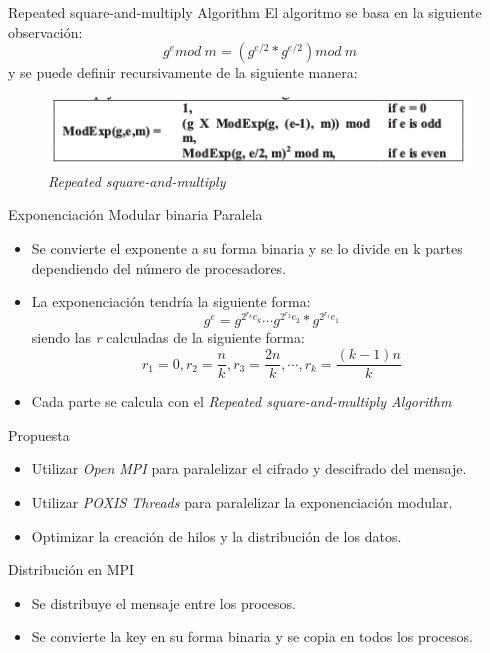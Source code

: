 \documentclass{beamer}
\begin{document}
\begin{frame}{Repeated square-and-multiply Algorithm}
  El algoritmo se basa en la siguiente observación:
  $$g^{e} mod\:m = (g^{e/2} * g^{e/2}) mod\:m$$
  y se puede definir recursivamente de la siguiente manera:
  \begin{figure}
   \centering
   \includegraphics[scale = 0.5]{1.png}
   \caption{\textit{Repeated square-and-multiply} \cite{Paper}}
   \label{fig:1}
  \end{figure}
\end{frame}

\begin{frame}{Exponenciación Modular binaria Paralela}
\begin{itemize}
 \item Se convierte el exponente a su forma binaria y se lo divide en k partes dependiendo del número de procesadores.
 \item La exponenciación tendría la siguiente forma:
 $$g^{e} = g^{2^{r_{k}}e_{k}} \cdots g^{2^{r_{2}}e_{2}}*g^{2^{r_{1}}e_{1}}$$
 siendo las \textit{r} calculadas de la siguiente forma:
 $$r_{1} = 0, r_{2} = \frac{n}{k}, r_{3} = \frac{2n}{k},\cdots,r_{k} = \frac{(k-1)n}{k}$$
 \item Cada parte se calcula con el \textit{Repeated square-and-multiply Algorithm}
\end{itemize}
\end{frame}

\begin{frame}{Propuesta}
  \begin{itemize}
   \item Utilizar \textit{Open MPI} para paralelizar el cifrado y descifrado del mensaje.
   \item Utilizar \textit{POXIS Threads} para paralelizar la exponenciación modular.
   \item Optimizar la creación de hilos y la distribución de los datos.
  \end{itemize}
\end{frame}


\begin{frame}{Distribución en MPI}
  \begin{itemize}
   \item Se distribuye el mensaje entre los procesos.
   \item Se convierte la key en su forma binaria y se copia en todos los procesos.
  \end{itemize}
\end{frame}
\end{document}
